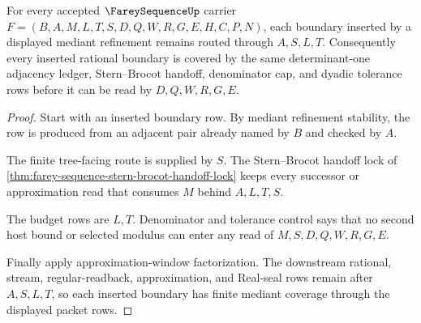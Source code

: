\begin{theorem}
\label{thm:farey-sequence-finite-mediant-coverage}
For every accepted $\FareySequenceUp$ carrier $F=(B,A,M,L,T,S,D,Q,W,R,G,E,H,C,P,N)$, each boundary inserted by a displayed mediant refinement remains routed through $A,S,L,T$. Consequently every inserted rational boundary is covered by the same determinant-one adjacency ledger, Stern--Brocot handoff, denominator cap, and dyadic tolerance rows before it can be read by $D,Q,W,R,G,E$.
\end{theorem}
\begin{proof}
Start with an inserted boundary row. By mediant refinement stability, the row is produced from an adjacent pair already named by $B$ and checked by $A$.

The finite tree-facing route is supplied by $S$. The Stern--Brocot handoff lock of \autoref{thm:farey-sequence-stern-brocot-handoff-lock} keeps every successor or approximation read that consumes $M$ behind $A,L,T,S$.

The budget rows are $L,T$. Denominator and tolerance control says that no second host bound or selected modulus can enter any read of $M,S,D,Q,W,R,G,E$.

Finally apply approximation-window factorization. The downstream rational, stream, regular-readback, approximation, and Real-seal rows remain after $A,S,L,T$, so each inserted boundary has finite mediant coverage through the displayed packet rows.
\end{proof}

